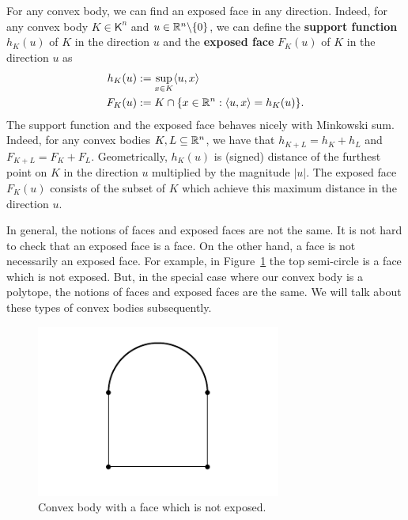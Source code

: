 \documentclass{puthesis-UG}
\begin{document}
For any convex body, we can find an exposed face in any direction. Indeed, for any convex body $K \in \mathsf{K}^n$ and $u \in \mathbb{R}^n \backslash \{0\}$, we can define the \textbf{support function} $h_K(u)$ of $K$ in the direction $u$ and the \textbf{exposed face} $F_K(u)$ of $K$ in the direction $u$ as 
\begin{align*}
	h_K(u) & := \sup_{x \in K} \langle u, x \rangle \\
	F_K(u) & := K \cap \{x \in \mathbb{R}^n : \langle u, x \rangle = h_K(u)\}.
\end{align*}
The support function and the exposed face behaves nicely with Minkowski sum. Indeed, for any convex bodies $K, L \subseteq \mathbb{R}^n$, we have that $h_{K+L} = h_K + h_L$ and $F_{K+L} = F_K + F_L$. Geometrically, $h_K(u)$ is (signed) distance of the furthest point on $K$ in the direction $u$ multiplied by the magnitude $|u|$. The exposed face $F_K(u)$ consists of the subset of $K$ which achieve this maximum distance in the direction $u$. 

\begin{remark}
	In general, the notions of faces and exposed faces are not the same. It is not hard to check that an exposed face is a face. On the other hand, a face is not necessarily an exposed face. For example, in Figure~\ref{counter-example} the top semi-circle is a face which is not exposed. But, in the special case where our convex body is a polytope, the notions of faces and exposed faces are the same. We will talk about these types of convex bodies subsequently. 
	
	\begin{figure}[h] \label{counter-example}
		\begin{center}
			\includegraphics[scale = 1]{image5.PNG}
			\caption{Convex body with a face which is not exposed.}
		\end{center}
	\end{figure}
	
\end{remark}
\end{document}
